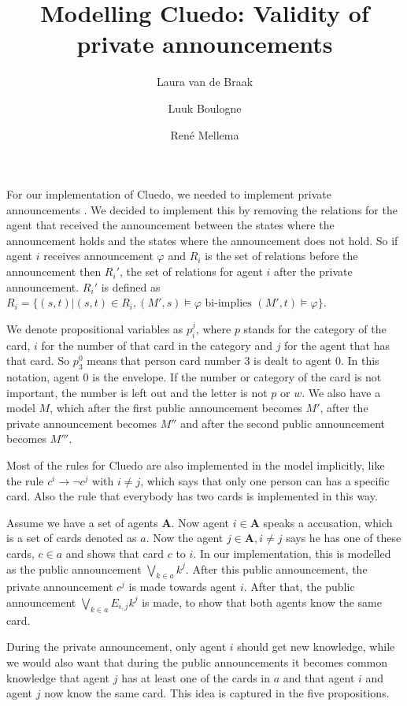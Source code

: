 \documentclass[a4paper, 10pt]{article}
\title{Modelling Cluedo: Validity of private announcements}
\author{Laura van de Braak \and Luuk Boulogne \and Ren\'e Mellema}
\date{}
\newcommand{\impl}{\rightarrow}
\newcommand{\A}{\mathbf{A}}
\begin{document}
\maketitle

For our implementation of Cluedo, we needed to implement private
announcements \citep[see][chapter 6]{ditmarsch2007dynamic}. We decided to
implement this by removing the relations for the agent that received the
announcement between the states where the announcement holds and the states
where the announcement does not hold. So if agent $i$ receives announcement
$\varphi$ and $R_i$ is the set of relations before the announcement then
$R_i'$, the set of relations for agent $i$ after the private announcement.
$R_i'$ is defined as $R_i = \{(s, t) | (s, t) \in R_i, (M', s) \models
\varphi \text{ bi-implies } (M', t) \models \varphi\}$.

We denote propositional variables as $p_i^j$, where $p$ stands for the
category of the card, $i$ for the number of that card in the category and
$j$ for the agent that has that card. So $p_3^0$ means that person card
number 3 is dealt to agent 0. In this notation, agent 0 is the envelope.
If the number or category of the card is not important, the number is left
out and the letter is not $p$ or $w$.  We also have a model $M$, which
after the first public announcement becomes $M'$, after the private
announcement becomes $M''$ and after the second public announcement becomes
$M'''$.

Most of the rules for Cluedo are also implemented in the model implicitly,
like the rule $c^i \impl \neg c^j$ with $i \not = j$, which says that only
one person can has a specific card. Also the rule that everybody has two
cards is implemented in this way.

Assume we have a set of agents $\A$. Now agent $i \in \A$ speaks a
accusation, which is a set of cards denoted as $a$. Now the agent $j \in
\A, i \not = j$ says he has one of these cards, $c \in a$ and shows that
card $c$ to $i$.  In our implementation, this is modelled as the public
announcement $\bigvee_{k \in a} k^j$. After this public announcement, the
private announcement $c^j$ is made towards agent $i$. After that, the
public announcement $\bigvee_{k \in a} E_{i, j} k^j$ is made, to show that
both agents know the same card. 

During the private announcement, only agent $i$ should get new knowledge,
while we would also want that during the public announcements it becomes
common knowledge that agent $j$ has at least one of the cards in $a$ and
that agent $i$ and agent $j$ now know the same card. This idea is captured
in the five propositions.
\end{document}
